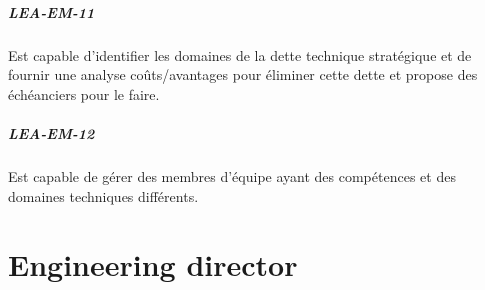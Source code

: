 \documentclass[a4paper, french, openany, 12pt]{book}
\newcommand\cha[1]{\textcolor{OliveGreen}{\textbf{\uppercase{lea-{#1}}}}}
\begin{document}
\begin{multicols}{2}
  \paragraph*{\cha{em-11}}

  Est capable d'identifier les domaines de la dette technique stratégique et de fournir une analyse coûts/avantages pour 
  éliminer cette dette et propose des échéanciers pour le faire.
  
  \paragraph*{\cha{em-12}}

  Est capable de gérer des membres d'équipe ayant des compétences et des domaines techniques différents.

\end{multicols}

\chapter{Engineering director}
\end{document}

